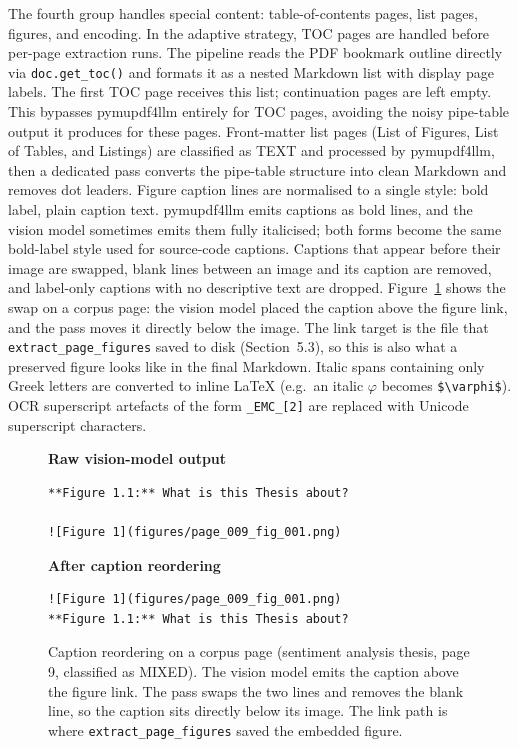 The fourth group handles special content: table-of-contents pages, list pages, figures, and encoding.
In the adaptive strategy, TOC pages are handled before per-page extraction runs.
The pipeline reads the PDF bookmark outline directly via \texttt{doc.get\_toc()} and formats it as a nested Markdown list with display page labels.
The first TOC page receives this list; continuation pages are left empty.
This bypasses pymupdf4llm entirely for TOC pages, avoiding the noisy pipe-table output it produces for these pages.
Front-matter list pages (List of Figures, List of Tables, and Listings) are classified as TEXT and processed by pymupdf4llm, then a dedicated pass converts the pipe-table structure into clean Markdown and removes dot leaders.
Figure caption lines are normalised to a single style: bold label, plain caption text.
pymupdf4llm emits captions as bold lines, and the vision model sometimes emits them fully italicised; both forms become the same bold-label style used for source-code captions.
Captions that appear before their image are swapped, blank lines between an image and its caption are removed, and label-only captions with no descriptive text are dropped.
Figure~\ref{fig:caption_reorder} shows the swap on a corpus page: the vision model placed the caption above the figure link, and the pass moves it directly below the image.
The link target is the file that \texttt{extract\_page\_figures} saved to disk (Section~5.3), so this is also what a preserved figure looks like in the final Markdown.
Italic spans containing only Greek letters are converted to inline LaTeX (e.g.\ an italic $\varphi$ becomes \texttt{\$\textbackslash varphi\$}).
OCR superscript artefacts of the form \texttt{\_EMC\_[2]} are replaced with Unicode superscript characters.

\begin{figure}[ht]
\medskip\noindent\textbf{Raw vision-model output}
\begin{lstlisting}[language={},nolol,identifierstyle=\color{black},basicstyle=\footnotesize\ttfamily\color{black},upquote=true,breakatwhitespace=true]
**Figure 1.1:** What is this Thesis about?

![Figure 1](figures/page_009_fig_001.png)
\end{lstlisting}

\medskip\noindent\textbf{After caption reordering}
\begin{lstlisting}[language={},nolol,identifierstyle=\color{black},basicstyle=\footnotesize\ttfamily\color{black},upquote=true,breakatwhitespace=true]
![Figure 1](figures/page_009_fig_001.png)
**Figure 1.1:** What is this Thesis about?
\end{lstlisting}
\caption{Caption reordering on a corpus page (sentiment analysis thesis,
page 9, classified as MIXED). The vision model emits the caption above the
figure link. The pass swaps the two lines and removes the blank line, so
the caption sits directly below its image. The link path is where
\texttt{extract\_page\_figures} saved the embedded figure.}
\label{fig:caption_reorder}
\end{figure}

